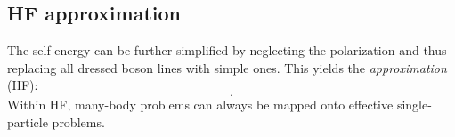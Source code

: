 \subsection{HF approximation}

The self-energy can be further simplified by neglecting the polarization and
thus replacing all dressed boson lines with simple ones. This yields the
\emph{ approximation} (HF):
%
\begin{equation} \label{HF approximation}
    .
\end{equation}
%
Within HF, many-body problems can always be mapped onto effective
single-particle problems.
